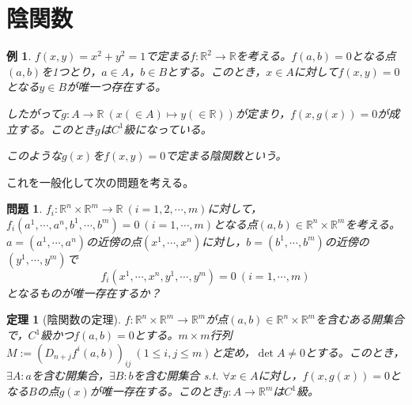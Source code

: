 \documentclass[dvipdfmx,a4j,10pt]{jsarticle}
\theoremstyle{mystyle1}
\newtheorem{thm}[dfn]{定理}
\theoremstyle{mystyle2}
\newtheorem{example}{例}
\newtheorem{qes}{問題}
\begin{document}
\newpage


\section{陰関数}
\begin{example}
	$f(x,y)=x^2+y^2=1$で定まる$f:\mathbb{R}^2\to\mathbb{R}$を考える。$f(a,b)=0$となる点$(a,b)$を1つとり，$a\in A$，$b\in B$とする。このとき，$x\in A$に対して$f(x,y)=0$となる$y\in B$が唯一つ存在する。

	したがって$g:A\to\mathbb{R}\ (x(\in A)\mapsto y(\in\mathbb{R}))$が定まり，$f(x,g(x))=0$が成立する。このとき$g$は$C^1$級になっている。

	このような$g(x)$を$f(x,y)=0$で定まる陰関数という。
\end{example}

これを一般化して次の問題を考える。

\begin{qes}
	$f_i:\mathbb{R}^n\times\mathbb{R}^m\to\mathbb{R}\ (i=1,2,\cdots,m)$に対して，	$f_i(a^1,\cdots,a^n,b^1,\cdots,b^m)=0\ (i=1,\cdots,m)$となる点$(a,b)\in\mathbb{R}^n\times\mathbb{R}^m$を考える。$a=(a^1,\cdots,a^n)$の近傍の点$(x^1,\cdots,x^n)$に対し，$b=(b^1,\cdots,b^m)$の近傍の$(y^1,\cdots,y^m)$で
	\[
	f_i(x^1,\cdots,x^n,y^1,\cdots,y^m)=0\ (i=1,\cdots,m)
	\]
	となるものが唯一存在するか？
\end{qes}

\begin{framed}
	\begin{thm}[陰関数の定理]
		$f:\mathbb{R}^n\times\mathbb{R}^m\to\mathbb{R}^m$が点$(a,b)\in\mathbb{R}^n\times\mathbb{R}^m$を含むある開集合で，$C^1$級かつ$f(a,b)=0$とする。$m\times m$行列$M:=(D_{n+j}f^i(a,b))_{ij}\ (1\leq i,j\leq m)$と定め，$\det A\neq 0$とする。このとき，$\exists A:a$を含む開集合，$\exists B:b$を含む開集合 s.t. $\forall x\in A$に対し，$f(x,g(x))=0$となる$B$の点$g(x)$が唯一存在する。このとき$g:A\to\mathbb{R}^m$は$C^1$級。
	\end{thm}
\end{framed}
\end{document}
